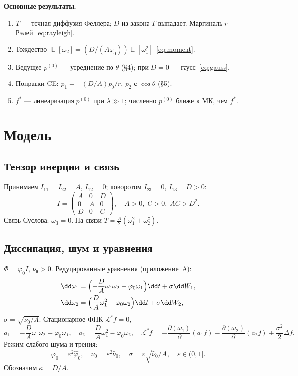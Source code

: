 \documentclass[12pt,a4paper]{article}
\newcommand{\pd}[2]{\frac{\partial #1}{\partial #2}}
\DeclareMathOperator{\E}{\mathbb{E}}
\newcommand{\phiz}{\varphi_0}
\newcommand{\nuz}{\nu_0}
\begin{document}
\textbf{Основные результаты.}
\begin{enumerate}
  \item $T$ --- точная диффузия Феллера; $D$ из закона $T$ выпадает. Маргиналь $r$ --- Рэлей~\eqref{eq:rayleigh}.
  \item Тождество $\E[\omega_2]=(D/(A\phiz))\E[\omega_1^2]$~\eqref{eq:moment}.
  \item Ведущее $p^{(0)}$ --- усреднение по $\theta$ (§4); при $D=0$ --- гаусс~\eqref{eq:gauss}.
  \item Поправки CE: $p_1=-(D/A)p_0/r$, $p_2$ с $\cos\theta$ (§5).
  \item $f^*$ --- линеаризация $p^{(0)}$ при $\lambda\gg1$; численно $p^{(0)}$ ближе к МК, чем $f^*$.
\end{enumerate}

\section{Модель}

\subsection{Тензор инерции и связь}

Принимаем $I_{11}=I_{22}=A$, $I_{12}=0$; поворотом $I_{23}=0$, $I_{13}=D>0$:
\begin{equation}\label{eq:tensor}
  I=\begin{pmatrix} A&0&D\\ 0&A&0\\ D&0&C \end{pmatrix},
  \quad A>0,\; C>0,\; AC>D^2.
\end{equation}
Связь Суслова: $\omega_3=0$. На связи $T=\frac{A}{2}(\omega_1^2+\omega_2^2)$.

\subsection{Диссипация, шум и уравнения}

$\Phi=\phiz I$, $\nuz>0$. Редуцированные уравнения (приложение~A):
\begin{align}
  \dd\omega_1 &= \Bigl(-\frac{D}{A}\omega_1\omega_2-\phiz\omega_1\Bigr)\dd t+\sigma\dd W_1,
  \label{eq:sde}\\
  \dd\omega_2 &= \Bigl(\frac{D}{A}\omega_1^2-\phiz\omega_2\Bigr)\dd t+\sigma\dd W_2,
  \notag
\end{align}
$\sigma=\sqrt{\nuz/A}$. Стационарное ФПК $\mathcal{L}^*f=0$,
\begin{equation}\label{eq:fpk}
  a_1=-\frac{D}{A}\omega_1\omega_2-\phiz\omega_1,\quad
  a_2=\frac{D}{A}\omega_1^2-\phiz\omega_2,\quad
  \mathcal{L}^*f=-\pd{(\omega_1)}{}(a_1 f)-\pd{(\omega_2)}{}(a_2 f)+\frac{\sigma^2}{2}\Delta f.
\end{equation}
Режим слабого шума и трения:
\begin{equation}\label{eq:scaling}
  \phiz=\varepsilon^2\hat\phiz,\quad \nuz=\varepsilon^2\hat\nuz,\quad
  \sigma=\varepsilon\sqrt{\hat\nuz/A},\quad \varepsilon\in(0,1].
\end{equation}
Обозначим $\kappa=D/A$.
\end{document}
